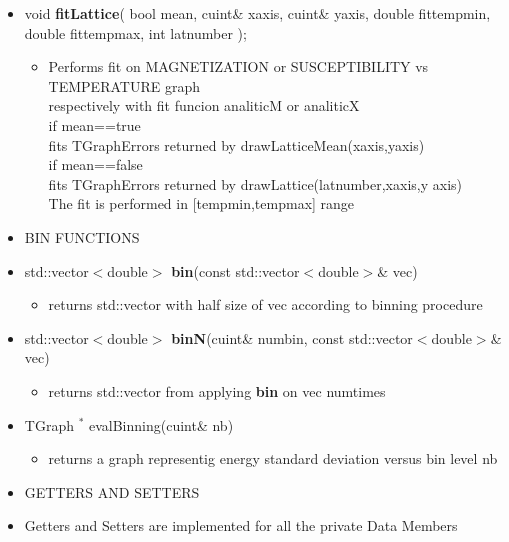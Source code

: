 \begin{itemize}
\begin{itemize}
  \item[] void \textbf{fitLattice}( bool mean,
    cuint\& x\textunderscore axis,
    cuint\& y\textunderscore axis,
    double fit\textunderscore temp\textunderscore min,
    double fit\textunderscore temp\textunderscore max,
    int lat\textunderscore number
    );
    \begin{itemize}
    \item[] Performs fit on MAGNETIZATION or SUSCEPTIBILITY vs TEMPERATURE graph\\
			respectively with fit funcion analiticM or analiticX \\    
    		if mean==true\\
    		fits TGraphErrors returned by drawLatticeMean(x\textunderscore axis,y\textunderscore axis)\\
    		if mean==false\\
    		fits TGraphErrors returned by drawLattice(lat\textunderscore number,x\textunderscore axis,y					\textunderscore axis)\\
    		The fit is performed in [temp\textunderscore min,temp\textunderscore max] range
    \end{itemize}


  \item[] BIN FUNCTIONS \\

  \item[] std::vector$<$double$>$ \textbf{bin}(const std::vector$<$double$>$\& vec)
    \begin{itemize}
    \item[] returns std::vector with half size of vec according to binning procedure
    \end{itemize}
    
  \item[] std::vector$<$double$>$ \textbf{binN}(cuint\& num\textunderscore bin, const std::vector$<$double$>$\& vec)
    \begin{itemize}
    \item[] returns std::vector from applying \textbf{bin} on vec num\textunderscore times 
    \end{itemize}
    
  \item[] TGraph ${}^*$ evalBinning(cuint\& nb)
	\begin{itemize}
    \item[] returns a graph representig energy standard deviation versus bin level nb
    \end{itemize}
    
    
  \item[] GETTERS AND SETTERS \\

  \item[] Getters and Setters are implemented for all the private Data Members 
  
  \end{itemize}
\end{itemize}

